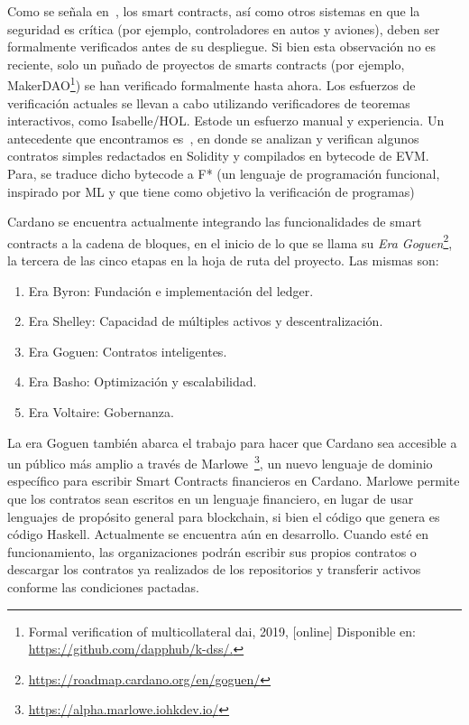\documentclass[12pt]{book}
\begin{document}
Como se señala en~\cite{9152791}, los smart contracts, así como otros sistemas en que la seguridad es crítica (por ejemplo, controladores en autos y aviones), deben ser formalmente verificados antes de su despliegue. Si bien esta observación no es reciente, solo un puñado de proyectos de smarts contracts (por ejemplo, MakerDAO\footnote{Formal verification of multicollateral dai, 2019, [online] Disponible en: \href{https://github.com/dapphub/k-dss/.}{https://github.com/dapphub/k-dss/.}}) se han verificado formalmente hasta ahora. Los esfuerzos de verificación actuales se llevan a cabo utilizando verificadores de teoremas interactivos, como Isabelle/HOL. Esto\@requiere de un esfuerzo manual y experiencia. Un antecedente que encontramos es~\cite{bhargavan:hal-01400469}, en donde se analizan y verifican algunos contratos simples redactados en Solidity y compilados en bytecode de EVM. Para\@ello, se traduce dicho bytecode a F* (un lenguaje de programación funcional, inspirado por ML y que tiene como objetivo la verificación de programas)

Cardano se encuentra actualmente integrando las funcionalidades de smart contracts a la cadena de bloques, en el inicio de lo que se llama su \textit{Era Goguen}\footnote{\href{https://roadmap.cardano.org/en/goguen/}{https://roadmap.cardano.org/en/goguen/}}, la tercera de las cinco etapas en la hoja de ruta del proyecto. Las mismas son:

\begin{enumerate}
    \item Era Byron: Fundación e implementación del ledger.
    \item Era Shelley: Capacidad de múltiples activos y descentralización.
    \item Era Goguen: Contratos inteligentes.
    \item Era Basho: Optimización y escalabilidad.
    \item Era Voltaire: Gobernanza.
\end{enumerate}

La era Goguen también abarca el trabajo para hacer que Cardano sea accesible a un público más amplio a través de Marlowe~\footnote{\href{https://alpha.marlowe.iohkdev.io/}{https://alpha.marlowe.iohkdev.io/}}, un nuevo lenguaje de dominio específico para escribir Smart Contracts financieros en Cardano. Marlowe permite que los contratos sean escritos en un lenguaje financiero, en lugar de usar lenguajes de propósito general para blockchain, si bien el código que genera es código Haskell. Actualmente se encuentra aún en desarrollo. Cuando esté en funcionamiento, las organizaciones podrán escribir sus propios contratos o descargar los contratos ya realizados de los repositorios y transferir activos conforme las condiciones pactadas.
\end{document}
